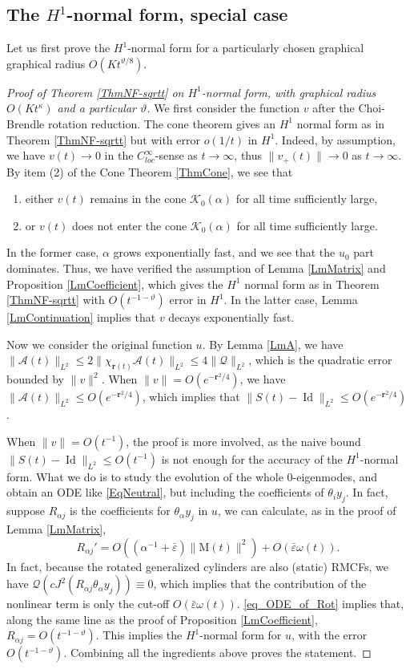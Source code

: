 \documentclass[11pt]{amsart}
\numberwithin{equation}{section}
\numberwithin{equation}{section}
\newcommand{\eps}{\varepsilon}
\newcommand{\br}{\mathbf{r}}
\newcommand{\cA}{\mathcal{A}}
\newcommand{\cK}{\mathcal{K}}
\newcommand{\cQ}{\mathcal{Q}}
\DeclareMathOperator{\id}{\text{Id}}
\begin{document}
	\subsection{The $H^1$-normal form, special case}\label{SNF}
	Let us first prove the $H^1$-normal form for a particularly chosen graphical graphical radius $O(K t^{\vartheta/8})$.
	\begin{proof}[Proof of Theorem \ref{ThmNF-sqrtt} on $H^1$-normal form, with graphical radius $O(Kt^{\kappa})$ and a particular $\vartheta$]
		We first consider the function $v$ after the Choi-Brendle rotation reduction. The cone theorem gives an $H^1$ normal form as in Theorem \ref{ThmNF-sqrtt} but with error $o(1/t)$ in $H^1$. Indeed, by assumption, we have $v(t)\to0$ in the $C^\infty_{loc}$-sense as $t\to\infty$, thus $\|v_+(t)\|\to0$ as $t\to\infty$. By item (2) of the Cone Theorem \ref{ThmCone}, we see that 
		\begin{enumerate}
			\item either $v(t)$ remains in the cone $\cK_0(\alpha)$ for all time sufficiently large, 
			\item or $v(t)$ does not enter the cone $\cK_0(\alpha)$ for all time sufficiently large. 
		\end{enumerate}
		In the former case, $\alpha$ grows exponentially fast, and we see that the $u_0$ part dominates. Thus, we have verified the assumption of Lemma \ref{LmMatrix} and Proposition \ref{LmCoefficient}, which gives the $H^1$ normal form as in Theorem \ref{ThmNF-sqrtt} with $O(t^{-1-\vartheta})$ error in $H^1$. In the latter case, Lemma \ref{LmContinuation} implies that $v$ decays exponentially fast.
		
		
		Now we consider the original function $u$. By Lemma \ref{LmA}, we have $\|\cA(t)\|_{L^2}\leq 2\|\chi_{\br(t)}\cA(t)\|_{L^2}\leq 4\|\cQ\|_{L^2}$, which is the quadratic error bounded by $\|v\|^2$. When $\|v\|=O(e^{-\br^2/4})$, we have $\|\cA(t)\|_{L^2}\leq O(e^{-\br^2/4})$, which implies that $\|S(t)-\id\|_{L^2}\leq O(e^{-\br^2/4})$.
		
		When $\|v\|=O(t^{-1})$, the proof is more involved, as the naive bound $\|S(t)-\id\|_{L^2}\leq O(t^{-1})$ is not enough for the accuracy of the $H^1$-normal form. What we do is to study the evolution of the whole $0$-eigenmodes, and obtain an ODE like \eqref{EqNeutral}, but including the coefficients of $\theta_i y_j$. In fact, suppose $R_{\alpha j}$ is the coefficients for $\theta_\alpha y_j$ in $u$, we can calculate, as in the proof of Lemma \ref{LmMatrix},
		\begin{equation}\label{eq_ODE_of_Rot}
			R_{\alpha j}'=O((\alpha^{-1}+\bar\eps)\|\mathrm{M}(t)\|^2)+O(\bar\eps\omega(t)).
		\end{equation}
		In fact, because the rotated generalized cylinders are also (static) RMCFs, we have $\cQ(cJ^2(R_{\alpha j}\theta_\alpha y_j))\equiv 0$, which implies that the contribution of the nonlinear term is only the cut-off $O(\bar\eps\omega(t))$. \eqref{eq_ODE_of_Rot} implies that, along the same line as the proof of Proposition \ref{LmCoefficient}, $R_{\alpha j}=O(t^{-1-\vartheta})$. This implies the $H^1$-normal form for $u$, with the error $O(t^{-1-\vartheta}).$ Combining all the ingredients above proves the statement.
		

\end{proof}
\end{document}
